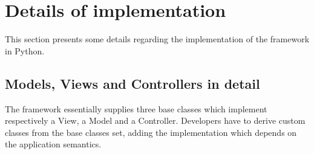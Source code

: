
\section{\label{DI}Details of implementation}
This section presents some details regarding the implementation of the
\mvco framework in Python.

\subsection{Models, Views and Controllers in detail}
The \mvco framework essentially supplies three base classes which
implement respectively a View, a Model and a Controller. Developers
have to derive custom classes from the base classes set, adding the
implementation which depends on the application semantics.

